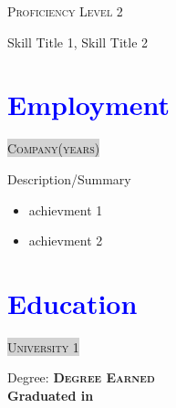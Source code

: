 \documentclass[a4paper, oneside, final]{scrartcl}
\begin{document}
\begin{center}
\begin{multicols}{2}
		\begin{multicols}{2}
			\begin{flushleft}
				\textsc{Proficiency Level 2}
			\end{flushleft}
			\vspace{12em}

			Skill Title 1, Skill Title 2
		\end{multicols}

    \end{multicols}

\section{\textcolor{blue}{Employment}} 


    \begin{flushleft}
        
        \parbox{\textwidth} {
            \colorbox{LightGrey} {
                \textsc{\small{Company}\tiny{(years)}}
            }
        } 
        
    \end{flushleft}

    \begin{flushleft}
        \hspace{2em}Description/Summary

    \begin{itemize} \itemsep1pt \parskip0pt 
        \item achievment 1
		\item achievment 2
    \end{itemize}
    \end{flushleft}

\section{\textcolor{blue}{Education}} 

    \begin{multicols}{2}

        \parbox{\columnwidth} {
            \colorbox{LightGrey} {
                \textsc{\small{University 1}}
            }
        }

        \begin{flushleft}
            \small{Degree}: \bf{\textsc{Degree Earned}} \\
            \small{\bf{Graduated in}} \textsc{\bf{}} \\ 
        \end{flushleft}


\end{multicols}
\end{center}
\end{document}
